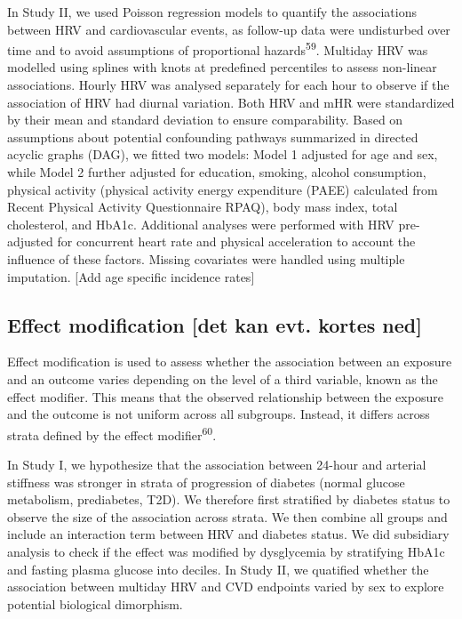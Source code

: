 \documentclass[
  a4paper,
  headsepline=true,
  open=any]{scrbook}
\begin{document}
In Study II, we used Poisson regression models to quantify the
associations between HRV and cardiovascular events, as follow-up data
were undisturbed over time and to avoid assumptions of proportional
hazards\textsuperscript{59}. Multiday HRV was modelled using splines
with knots at predefined percentiles to assess non-linear associations.
Hourly HRV was analysed separately for each hour to observe if the
association of HRV had diurnal variation. Both HRV and mHR were
standardized by their mean and standard deviation to ensure
comparability. Based on assumptions about potential confounding pathways
summarized in directed acyclic graphs (DAG), we fitted two models: Model
1 adjusted for age and sex, while Model 2 further adjusted for
education, smoking, alcohol consumption, physical activity (physical
activity energy expenditure (PAEE) calculated from Recent Physical
Activity Questionnaire RPAQ), body mass index, total cholesterol, and
HbA1c. Additional analyses were performed with HRV pre-adjusted for
concurrent heart rate and physical acceleration to account the influence
of these factors. Missing covariates were handled using multiple
imputation. {[}Add age specific incidence rates{]}

\hypertarget{effect-modification-det-kan-evt.-kortes-ned}{%
\subsection{Effect modification {[}det kan evt. kortes
ned{]}}\label{effect-modification-det-kan-evt.-kortes-ned}}

Effect modification is used to assess whether the association between an
exposure and an outcome varies depending on the level of a third
variable, known as the effect modifier. This means that the observed
relationship between the exposure and the outcome is not uniform across
all subgroups. Instead, it differs across strata defined by the effect
modifier\textsuperscript{60}.

In Study I, we hypothesize that the association between 24-hour and
arterial stiffness was stronger in strata of progression of diabetes
(normal glucose metabolism, prediabetes, T2D). We therefore first
stratified by diabetes status to observe the size of the association
across strata. We then combine all groups and include an interaction
term between HRV and diabetes status. We did subsidiary analysis to
check if the effect was modified by dysglycemia by stratifying HbA1c and
fasting plasma glucose into deciles. In Study II, we quatified whether
the association between multiday HRV and CVD endpoints varied by sex to
explore potential biological dimorphism.
\end{document}
